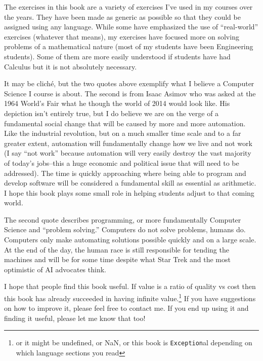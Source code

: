 The exercises in this book are a variety of exercises I've used in my courses over the years.  
They have been made as generic as possible so that they could be assigned using any
language.  While some have emphasized the use of ``real-world'' exercises (whatever that 
means), my exercises have focused more on solving problems of a mathematical nature
(most of my students have been Engineering students).  Some of them are more easily 
understood if students have had Calculus but it is not absolutely necessary.

It may be clich\'{e}, but the two quotes above exemplify what I believe a Computer Science
I course is about.  The second is from Isaac Asimov who was asked at the 1964 
World's Fair what he though the world of 2014 would look like.  His depiction isn't
entirely true, but I do believe we are on the verge of a fundamental social change
that will be caused by more and more automation.  Like the industrial revolution, but
on a much smaller time scale and to a far greater extent, automation will fundamentally
change how we live and not work (I say ``not work'' because automation will very
easily destroy the vast majority of today's jobs--this a huge economic and 
political issue that will need to be addressed).  The time is quickly approaching 
where being able to program and develop software will be considered a fundamental
skill as essential as arithmetic.  I hope this book plays some small role in helping
students adjust to that coming world.

The second quote describes programming, or more fundamentally Computer Science
and ``problem solving.''  Computers do not solve problems, humans do.  Computers
only make automating solutions possible quickly and on a large scale.  At the end
of the day, the human race is still responsible for tending the machines and will be
for some time despite what Star Trek and the most optimistic of AI advocates think.

I hope that people find this book useful.  If value is a ratio of quality vs cost then 
this book has already succeeded in having infinite value.\footnote{or it might
be undefined, or NaN, or this book is \texttt{Exception}al depending on which
language sections you read}  If you have suggestions on how to improve it, please
feel free to contact me.  If you end up using it and finding it useful, please let
me know that too!


